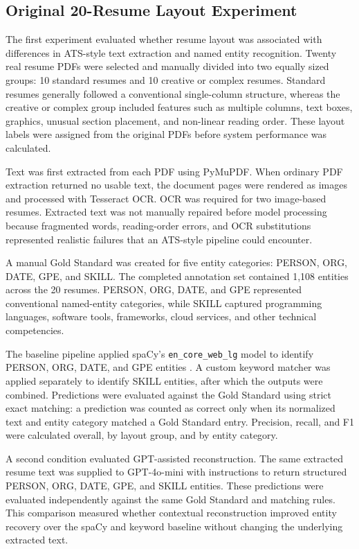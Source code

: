 \documentclass[conference]{IEEEtran}
\begin{document}
\subsection{Original 20-Resume Layout Experiment}

The first experiment evaluated whether resume layout was associated
with differences in ATS-style text extraction and named entity
recognition. Twenty real resume PDFs were selected and manually divided
into two equally sized groups: 10 standard resumes and 10 creative or
complex resumes. Standard resumes generally followed a conventional
single-column structure, whereas the creative or complex group included
features such as multiple columns, text boxes, graphics, unusual
section placement, and non-linear reading order. These layout labels
were assigned from the original PDFs before system performance was
calculated.

Text was first extracted from each PDF using PyMuPDF. When ordinary PDF
extraction returned no usable text, the document pages were rendered as
images and processed with Tesseract OCR. OCR was required for two
image-based resumes. Extracted text was not manually repaired before
model processing because fragmented words, reading-order errors, and
OCR substitutions represented realistic failures that an ATS-style
pipeline could encounter.

A manual Gold Standard was created for five entity categories:
PERSON, ORG, DATE, GPE, and SKILL. The completed annotation set
contained 1,108 entities across the 20 resumes. PERSON, ORG, DATE, and
GPE represented conventional named-entity categories, while SKILL
captured programming languages, software tools, frameworks, cloud
services, and other technical competencies.

The baseline pipeline applied spaCy's
\texttt{en\_core\_web\_lg} model to identify PERSON, ORG, DATE, and
GPE entities \cite{spacy2020}. A custom keyword matcher was applied
separately to identify SKILL entities, after which the outputs were
combined. Predictions were evaluated against the Gold Standard using
strict exact matching: a prediction was counted as correct only when
its normalized text and entity category matched a Gold Standard entry.
Precision, recall, and F1 were calculated overall, by layout group, and
by entity category.

A second condition evaluated GPT-assisted reconstruction. The same
extracted resume text was supplied to GPT-4o-mini with instructions to
return structured PERSON, ORG, DATE, GPE, and SKILL entities. These
predictions were evaluated independently against the same Gold Standard
and matching rules. This comparison measured whether contextual
reconstruction improved entity recovery over the spaCy and keyword
baseline without changing the underlying extracted text.
\end{document}
